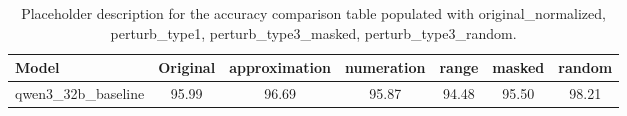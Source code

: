 \begin{table}[ht]
\centering
{}
\small
\begin{tabular}{lcccccc}
\hline
Model & Original & approximation & numeration & range & masked & random \\
\hline
qwen3\_32b\_baseline & 95.99 & 96.69 & 95.87 & 94.48 & 95.50 & 98.21 \\
\hline
\end{tabular}
\caption{Placeholder description for the accuracy comparison table populated with original\_normalized, perturb\_type1, perturb\_type3\_masked, perturb\_type3\_random.}
\end{table}
